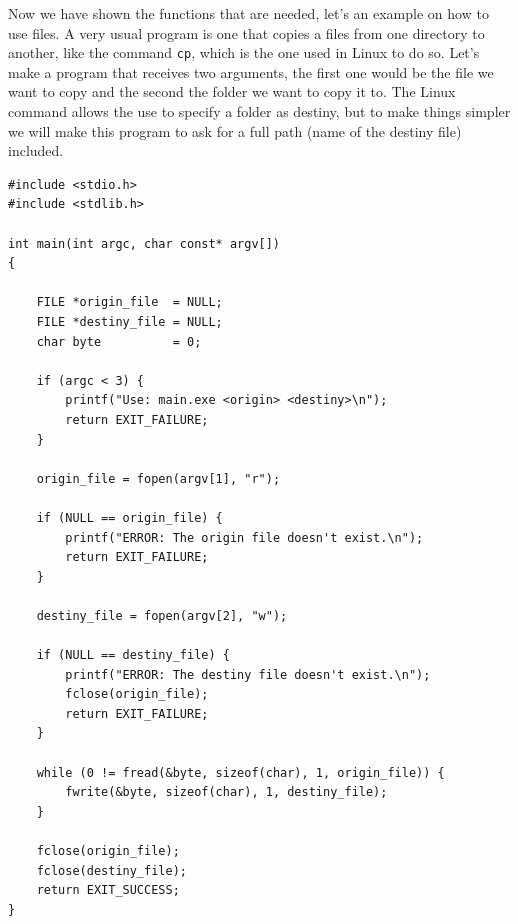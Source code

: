 \documentclass[a4paper]{article}
\begin{document}
Now we have shown the functions that are needed, let's an example on how to use
files. A very usual program is one that copies a files from one directory to
another, like the command \verb!cp!, which is the one used in Linux to do so.
Let's make a program that receives two arguments, the first one would be the
file we want to copy and the second the folder we want to copy it to. The Linux
command allows the use to specify a folder as destiny, but to make things
simpler we will make this program to ask for a full path (name of the destiny
file) included.

\noindent
\begin{minipage}[H]{\linewidth}
\mbox{}
\begin{lstlisting}[style=C,
caption={Example of basic file management},
label={lst:fileBasic}]
#include <stdio.h>
#include <stdlib.h>

int main(int argc, char const* argv[])
{

    FILE *origin_file  = NULL;
    FILE *destiny_file = NULL;
    char byte          = 0;

    if (argc < 3) {
        printf("Use: main.exe <origin> <destiny>\n");
        return EXIT_FAILURE;
    }

    origin_file = fopen(argv[1], "r");

    if (NULL == origin_file) {
        printf("ERROR: The origin file doesn't exist.\n");
        return EXIT_FAILURE;
    }

    destiny_file = fopen(argv[2], "w");

    if (NULL == destiny_file) {
        printf("ERROR: The destiny file doesn't exist.\n");
        fclose(origin_file);
        return EXIT_FAILURE;
    }

    while (0 != fread(&byte, sizeof(char), 1, origin_file)) {
        fwrite(&byte, sizeof(char), 1, destiny_file);
    }

    fclose(origin_file);
    fclose(destiny_file);
    return EXIT_SUCCESS;
}

\end{lstlisting}
\end{minipage}
\end{document}
